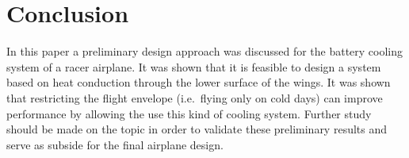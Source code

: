 \section{Conclusion}
\label{sec:conclusion}

In this paper a preliminary design approach was discussed for the battery cooling system of a racer airplane. It was shown that it is feasible to design a system based on heat conduction through the lower surface of the wings. It was shown that restricting the flight envelope (i.e.\ flying only on cold days) can improve performance by allowing the use this kind of cooling system. Further study should be made on the topic in order to validate these preliminary results and serve as subside for the final airplane design.

